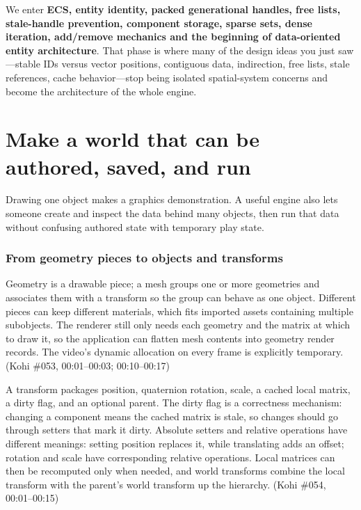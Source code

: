 We enter \textbf{ECS, entity identity, packed generational handles, free lists, stale-handle prevention, component storage, sparse sets, dense iteration, add/remove mechanics and the beginning of data-oriented entity architecture}. That phase is where many of the design ideas you just saw---stable IDs versus vector positions, contiguous data, indirection, free lists, stale references, cache behavior---stop being isolated spatial-system concerns and become the architecture of the whole engine.

\section{Make a world that can be authored, saved, and run}\label{06-engine-ii-ch031-make-a-world-that-can-be-authored-saved-and-run}

\hypertarget{06-engine-ii-ch031-make-a-world-that-can-be-authored-saved-and-run}{}

Drawing one object makes a graphics demonstration. A useful engine also lets someone create and inspect the data behind many objects, then run that data without confusing authored state with temporary play state.

\subsubsection{From geometry pieces to objects and transforms}\label{06-engine-ii-ch031-from-geometry-pieces-to-objects-and-transforms}

\hypertarget{06-engine-ii-ch031-from-geometry-pieces-to-objects-and-transforms}{}

Geometry is a drawable piece; a mesh groups one or more geometries and associates them with a transform so the group can behave as one object. Different pieces can keep different materials, which fits imported assets containing multiple subobjects. The renderer still only needs each geometry and the matrix at which to draw it, so the application can flatten mesh contents into geometry render records. The video's dynamic allocation on every frame is explicitly temporary. (Kohi \#053, 00:01--00:03; 00:10--00:17)

A transform packages position, quaternion rotation, scale, a cached local matrix, a dirty flag, and an optional parent. The dirty flag is a correctness mechanism: changing a component means the cached matrix is stale, so changes should go through setters that mark it dirty. Absolute setters and relative operations have different meanings: setting position replaces it, while translating adds an offset; rotation and scale have corresponding relative operations. Local matrices can then be recomputed only when needed, and world transforms combine the local transform with the parent's world transform up the hierarchy. (Kohi \#054, 00:01--00:15)

